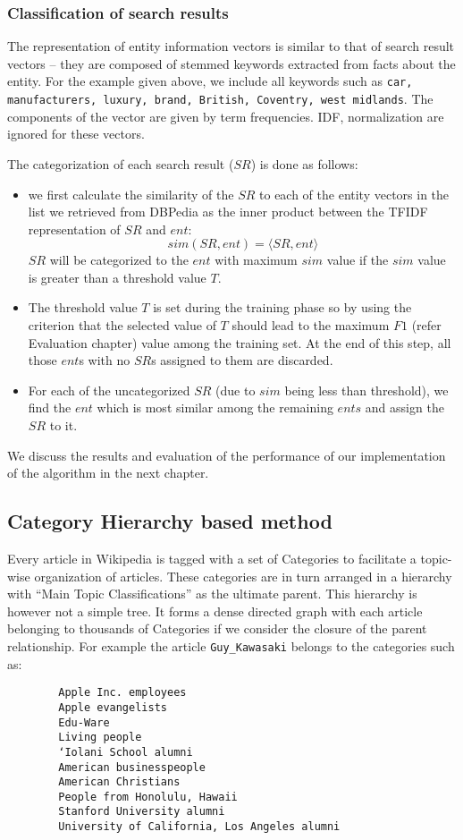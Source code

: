 \documentclass[a4paper,12pt]{report}
\begin{document}
\subsubsection{Classification of search results}
The representation of entity information vectors is similar to that of
search result vectors -- they are composed of stemmed keywords
extracted from facts about the entity. For the example given above, we
include all keywords such as {\tt car, manufacturers, luxury, brand,
  British, Coventry, west midlands}. The components of the vector are
given by term frequencies. IDF, normalization are ignored for these
vectors.

The categorization of each search result ($SR$) is done as follows:
\begin{itemize}
   \item we first calculate the similarity of the $SR$ to each of the
     entity vectors in the list we retrieved from DBPedia as the inner
     product between the TFIDF representation of $SR$ and $ent$:
     $$ sim(SR, ent) =  \langle SR, ent \rangle $$
     $SR$ will be categorized to the $ent$ with maximum $sim$ value if
     the $sim$ value is greater than a threshold value $T$.
    \item The threshold value $T$ is set during the training phase so
      by using the criterion that the selected value of $T$ should
      lead to the maximum $F1$ (refer Evaluation chapter) value among
      the training set. At the end of this step, all those $ent$s
      with no $SR$s assigned to them are discarded.
     \item For each of the uncategorized $SR$ (due to $sim$ being less
       than threshold), we find the $ent$ which is most similar among
       the remaining $ents$ and assign the $SR$ to it.
\end{itemize}

We discuss the results and evaluation of the performance of our
implementation of the algorithm in the next chapter. 

\subsection{Category Hierarchy based method}

Every article in Wikipedia is tagged with a set of Categories to
facilitate a topic-wise organization of articles. These categories are
in turn arranged in a hierarchy with ``Main Topic Classifications'' as
the ultimate parent. This hierarchy is however not a simple tree. It
forms a dense directed graph with each article belonging to thousands
of Categories if we consider the closure of the parent
relationship. For example the article \verb|Guy_Kawasaki| belongs to
the categories such as:
\begin{verbatim}
        Apple Inc. employees
        Apple evangelists
        Edu-Ware
        Living people
        ʻIolani School alumni
        American businesspeople
        American Christians
        People from Honolulu, Hawaii
        Stanford University alumni
        University of California, Los Angeles alumni
\end{verbatim}
\end{document}
